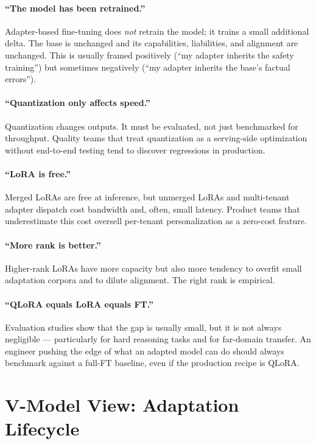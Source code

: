 \paragraph{``The model has been retrained.''}
Adapter-based fine-tuning does \emph{not} retrain the model; it
trains a small additional delta. The base is unchanged and its
capabilities, liabilities, and alignment are unchanged. This is
usually framed positively (``my adapter inherits the safety
training'') but sometimes negatively (``my adapter inherits the
base's factual errors'').

\paragraph{``Quantization only affects speed.''}
Quantization changes outputs. It must be evaluated, not just
benchmarked for throughput. Quality teams that treat quantization
as a serving-side optimization without end-to-end testing tend to
discover regressions in production.

\paragraph{``LoRA is free.''}
Merged LoRAs are free at inference, but unmerged LoRAs and
multi-tenant adapter dispatch cost bandwidth and, often, small
latency. Product teams that underestimate this cost oversell
per-tenant personalization as a zero-cost feature.

\paragraph{``More rank is better.''}
Higher-rank LoRAs have more capacity but also more tendency to
overfit small adaptation corpora and to dilute alignment. The right
rank is empirical.

\paragraph{``QLoRA equals LoRA equals FT.''}
Evaluation studies show that the gap is usually small, but it is
not always negligible --- particularly for hard reasoning tasks and
for far-domain transfer. An engineer pushing the edge of what an
adapted model can do should always benchmark against a full-FT
baseline, even if the production recipe is QLoRA.

\section{V-Model View: Adaptation Lifecycle}

